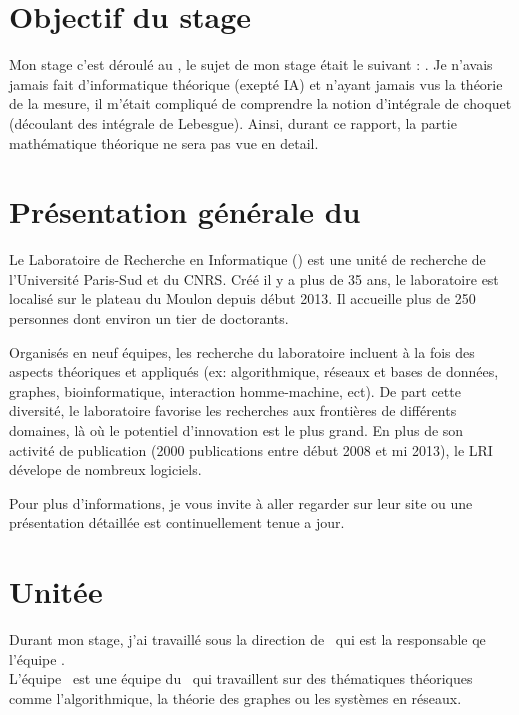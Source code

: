 
\section{Objectif du stage}
\label{sec:obj_rapide}

Mon stage c'est déroulé au \Lri, le sujet de mon stage était le suivant : \textit{\sujet}.
Je n'avais jamais fait d'informatique théorique (exepté IA)
et n'ayant jamais vus la théorie de la mesure,
il m'était compliqué de comprendre la notion d'intégrale de choquet (découlant des intégrale de Lebesgue).
Ainsi, durant ce rapport, la partie mathématique théorique ne sera pas vue en detail.

\section{Présentation générale du \lri}
\label{sec:pglri}

Le Laboratoire de Recherche en Informatique (\lri) est une unité de recherche de l'Université Paris-Sud et du \textsc{CNRS}.
Créé il y a plus de 35 ans, le laboratoire est localisé sur le plateau du Moulon depuis début 2013.
Il accueille plus de 250 personnes dont environ un tier de doctorants.


Organisés en neuf équipes, les recherche du laboratoire incluent à la fois des aspects théoriques et appliqués (ex: algorithmique, réseaux et bases de données, graphes, bioinformatique, interaction homme-machine, ect).
De part cette diversité, le laboratoire favorise les recherches aux frontières de différents domaines, là où le potentiel d'innovation est le plus grand.
En plus de son activité de publication (2000 publications entre début 2008 et mi 2013), le LRI dévelope de nombreux logiciels.


Pour plus d'informations, je vous invite à aller regarder sur leur site ou une présentation détaillée est continuellement tenue a jour\cite{LRI}.


\section{Unitée \galac}
\label{sec:galac}

Durant mon stage, j'ai travaillé sous la direction de \johanne\ qui est la responsable qe l'équipe \galac. \\
L'équipe \galac\ est une équipe du \lri\ qui travaillent sur des thématiques théoriques comme
l'algorithmique, la théorie des graphes ou les systèmes en réseaux.
